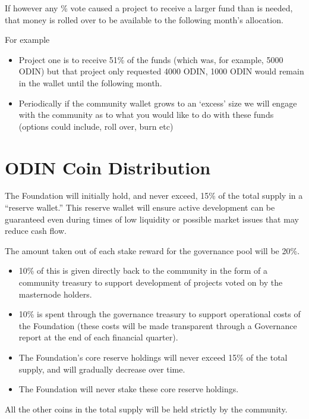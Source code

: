 \documentclass[12pt,letterpaper]{article}
\begin{document}
If however any \% vote caused a project to receive a larger fund than is needed, that money is rolled over to be available to the following month's allocation.

For example
\begin{itemize}
   \item Project one is to receive 51\% of the funds (which was, for example, 5000 ODIN) but that project only requested 4000 ODIN, 1000 ODIN would remain in the wallet until the following month.
   \item Periodically if the community wallet grows to an `excess' size we will engage with the community as to what you would like to do with these funds (options could include, roll over, burn etc)
\end{itemize}

\newpage
\section{ODIN Coin Distribution}
The Foundation will initially hold, and never exceed, 15\% of the total supply in a ``reserve wallet.'' This reserve wallet will ensure active development can be guaranteed even during times of low liquidity or possible market issues that may reduce cash flow.

The amount taken out of each stake reward for the governance pool will be 20\%.
\begin{itemize}
   \item 10\% of this is given directly back to the community in the form of a community treasury to support development of projects voted on by the masternode holders.
   \item 10\% is spent through the governance treasury to support operational costs of the Foundation (these costs will be made transparent through a Governance report at the end of each financial quarter).
   \item The Foundation's core reserve holdings will never exceed 15\% of the total supply, and will gradually decrease over time.
   \item The Foundation will never stake these core reserve holdings.
\end{itemize}

All the other coins in the total supply will be held strictly by the community.
\begin{center}
\end{center}
\end{document}
